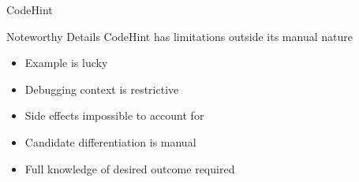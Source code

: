 \begin{frame}{CodeHint}
  \begin{block}{Noteworthy Details}
    CodeHint has limitations outside its manual nature

    \begin{itemize}
      \item Example is lucky
      \item Debugging context is restrictive
      \item Side effects impossible to account for
      \item Candidate differentiation is manual
      \item Full knowledge of desired outcome required
    \end{itemize}
  \end{block}
\end{frame}
